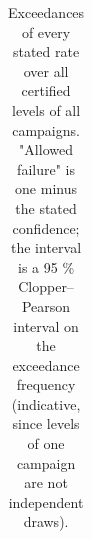 \documentclass{iopjournal}
\begin{document}
{\renewcommand{\thetable}{S5.1}\small
\begin{longtable}[]{@{}
  >{\raggedright\arraybackslash}p{}
  >{\raggedright\arraybackslash}p{}
  >{\raggedright\arraybackslash}p{}
  >{\raggedright\arraybackslash}p{}
  >{\raggedright\arraybackslash}p{}
  >{\raggedright\arraybackslash}p{}
  >{\raggedright\arraybackslash}p{}
  >{\raggedright\arraybackslash}p{}
  >{\raggedright\arraybackslash}p{}@{}}
\caption{Exceedances of every stated rate over all certified levels of all campaigns. "Allowed failure" is one minus the stated confidence; the interval is a 95 \% Clopper--Pearson interval on the exceedance frequency (indicative, since levels of one campaign are not independent draws).}\label{tab:S5.1}\\


\end{longtable}}
\end{document}
